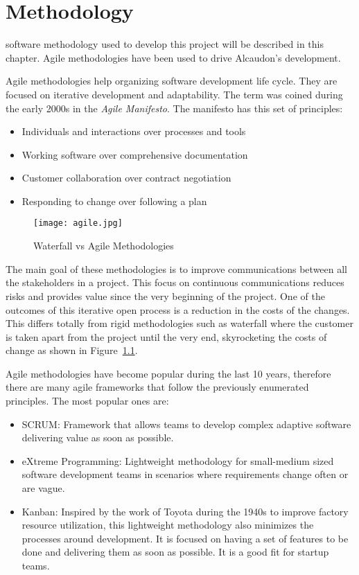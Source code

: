 \chapter{Methodology}
\label{chap:methodology}

 software methodology used to develop this project will be described in this
chapter. Agile methodologies have been used to drive Alcaudon's development.

Agile methodologies help organizing software development life cycle. They are
focused on iterative development and adaptability. The term was coined during
the early 2000s in the \textit{Agile Manifesto}\cite{manifesto}. The manifesto
has this set of principles:

\begin{itemize}
\item Individuals and interactions over processes and tools
\item Working software over comprehensive documentation
\item Customer collaboration over contract negotiation
\item Responding to change over following a plan
\end{itemize}


\begin{figure}
  \centering
  \texttt{[image: agile.jpg]}
  \caption{Waterfall vs Agile Methodologies\cite{waterfall}}
  \label{fig:waterfall}
\end{figure}

The main goal of these methodologies is to improve communications between all
the stakeholders in a project. This focus on continuous communications reduces
risks and provides value since the very beginning of the project. One of the
outcomes of this iterative open process is a reduction in the costs of the
changes. This differs totally from rigid methodologies such as waterfall where
the customer is taken apart from the project until the very end, skyrocketing
the costs of change as shown in Figure~\ref{fig:waterfall}.

Agile methodologies have become popular during the last 10 years, therefore there
are many agile frameworks that follow the previously enumerated principles. The
most popular ones are:
\begin{itemize}
\item SCRUM\cite{scrum}: Framework that allows teams to develop complex
  adaptive software delivering value as soon as possible.
\item eXtreme Programming\cite{xp}: Lightweight methodology for small-medium
  sized software development teams in scenarios where requirements change often
  or are vague.
\item Kanban\cite{kanban}: Inspired by the work of Toyota during the 1940s to improve
  factory resource utilization, this lightweight methodology also minimizes the processes
  around development. It is focused on having a set of features to be done and delivering
  them as soon as possible. It is a good fit for startup teams.
\end{itemize}

